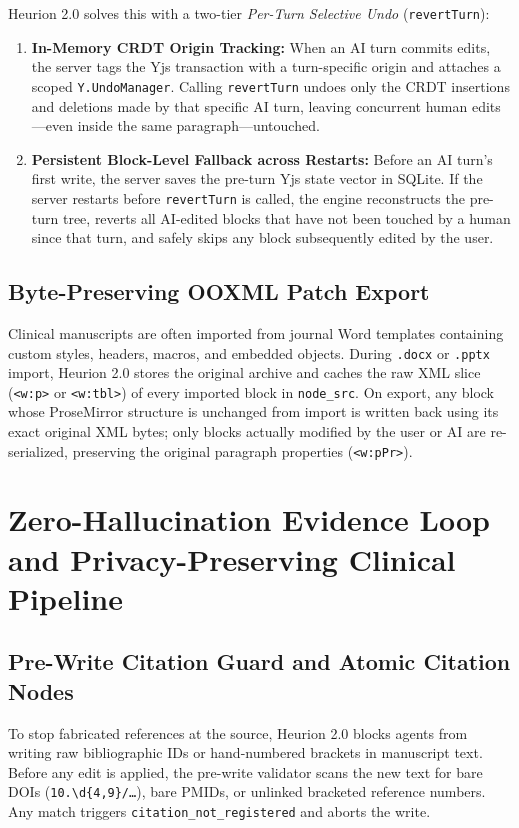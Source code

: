 \documentclass[11pt,a4paper]{article}
\begin{document}
Heurion 2.0 solves this with a two-tier \emph{Per-Turn Selective Undo} (\texttt{revertTurn}):
\begin{enumerate}[leftmargin=1.5em,itemsep=2pt]
  \item \textbf{In-Memory CRDT Origin Tracking:} When an AI turn commits edits, the server tags the Yjs transaction with a turn-specific origin and attaches a scoped \texttt{Y.UndoManager}. Calling \texttt{revertTurn} undoes only the CRDT insertions and deletions made by that specific AI turn, leaving concurrent human edits---even inside the same paragraph---untouched.
  \item \textbf{Persistent Block-Level Fallback across Restarts:} Before an AI turn's first write, the server saves the pre-turn Yjs state vector in SQLite. If the server restarts before \texttt{revertTurn} is called, the engine reconstructs the pre-turn tree, reverts all AI-edited blocks that have not been touched by a human since that turn, and safely skips any block subsequently edited by the user.
\end{enumerate}

\subsection{Byte-Preserving OOXML Patch Export}
Clinical manuscripts are often imported from journal Word templates containing custom styles, headers, macros, and embedded objects. During \texttt{.docx} or \texttt{.pptx} import, Heurion 2.0 stores the original archive and caches the raw XML slice (\texttt{<w:p>} or \texttt{<w:tbl>}) of every imported block in \texttt{node\_src}. On export, any block whose ProseMirror structure is unchanged from import is written back using its exact original XML bytes; only blocks actually modified by the user or AI are re-serialized, preserving the original paragraph properties (\texttt{<w:pPr>}).

\section{Zero-Hallucination Evidence Loop and Privacy-Preserving Clinical Pipeline}
\label{sec:evidence}

\subsection{Pre-Write Citation Guard and Atomic Citation Nodes}
To stop fabricated references at the source, Heurion 2.0 blocks agents from writing raw bibliographic IDs or hand-numbered brackets in manuscript text. Before any edit is applied, the pre-write validator scans the new text for bare DOIs (\texttt{10.\textbackslash d\{4,9\}/\dots}), bare PMIDs, or unlinked bracketed reference numbers. Any match triggers \texttt{citation\_not\_registered} and aborts the write.
\end{document}
